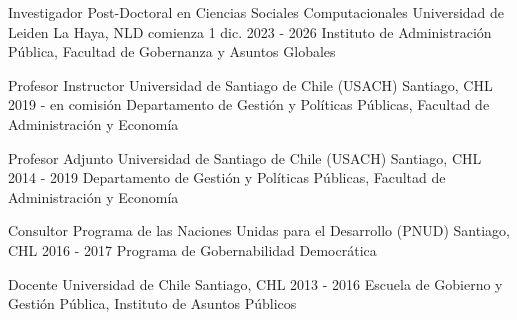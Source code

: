 





\begin{cventries}
\cventry
{Investigador Post-Doctoral en Ciencias Sociales Computacionales} 
{Universidad de Leiden} 
{La Haya, NLD} 
{comienza 1 dic. 2023 - 2026}
{Instituto de Administración Pública, Facultad de Gobernanza y Asuntos Globales} \vspace{1.5mm}

\cventry
{Profesor Instructor} 
{Universidad de Santiago de Chile (USACH)} 
{Santiago, CHL} 
{2019 - en comisión}
{Departamento de Gestión y Políticas Públicas, Facultad de Administración y Economía}\vspace{1.5mm}
\end{cventries}
\pagebreak


\begin{cventries}
\cventry
{Profesor Adjunto} 
{Universidad de Santiago de Chile (USACH)} 
{Santiago, CHL} 
{2014 - 2019}
{Departamento de Gestión y Políticas Públicas, Facultad de Administración y Economía}\vspace{1.5mm}

\cventry
{Consultor} 
{Programa de las Naciones Unidas para el Desarrollo (PNUD)} 
{Santiago, CHL} 
{2016 - 2017}
{Programa de Gobernabilidad Democrática} \vspace{1.5mm}

\cventry
{Docente} 
{Universidad de Chile} 
{Santiago, CHL} 
{2013 - 2016}
{Escuela de Gobierno y Gestión Pública, Instituto de Asuntos Públicos}\vspace{1.5mm}
\end{cventries}
